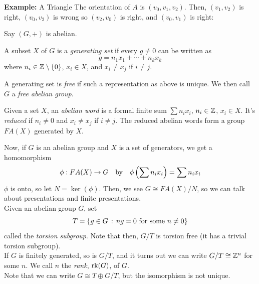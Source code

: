 \begin{example}{\textbf{Example:} A Triangle}
    The orientation of $A$ is $(v_0, v_1, v_2)$. Then, $(v_1, v_2)$ is right, $(v_0, v_2)$ is wrong so $(v_2, v_0)$ is right, and $(v_0, v_1)$ is right:
\end{example}

Say $(G, +)$ is abelian.

\begin{definition}
    A subset $X$ of $G$ is a \emph{generating set} if every $g \neq 0$ can be written as
    \[ g = n_1x_1 + \cdots + n_kx_k \]
    where $n_i \in \Z \setminus \{0\}$, $x_i \in X$, and $x_i \neq x_j$ if $i \neq j$.
\end{definition}

\begin{definition}
    A generating set is \emph{free} if such a representation as above is unique. We then call $G$ a \emph{free abelian group}.
\end{definition}

\begin{definition}
    Given a set $X$, an \emph{abelian word} is a formal finite sum $\sum n_ix_i$, $n_i \in \Z$, $x_i \in X$. It's \emph{reduced} if $n_i \neq 0$ and $x_i \neq x_j$ if $i \neq j$. The reduced abelian words form a group $FA(X)$ generated by $X$.
\end{definition}

Now, if $G$ is an abelian group and $X$ is a set of generators, we get a homomorphism
\[ \phi : FA(X) \to G \quad \tt{by} \quad \phi\left(\sum n_ix_i\right) = \sum n_ix_i \]
$\phi$ is onto, so let $N = \ker(\phi)$. Then, we see $G \cong FA(X)/N$, so we can talk about presentations and finite presentations.\\

Given an abelian group $G$, set
\[ T = \{g \in G \col ng = 0 \tt{ for some } n \neq 0\} \]
called the \emph{torsion subgroup}. Note that then, $G/T$ is torsion free (it has a trivial torsion subgroup).\\

If $G$ is finitely generated, so is $G/T$, and it turns out we can write $G/T \cong \Z^n$ for some $n$. We call $n$ the \emph{rank}, $\tt{rk}(G)$, of $G$.\\

Note that we can write $G \cong T \oplus G/T$, but the isomorphism is not unique.

